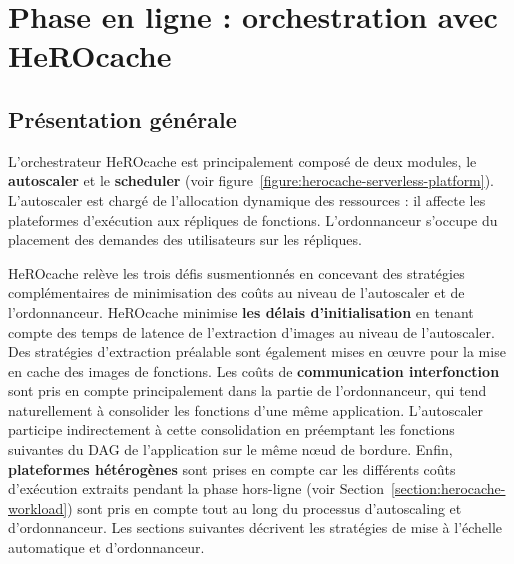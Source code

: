 \section{Phase en ligne : orchestration avec HeROcache} \label{section:herocache-contribution}

\subsection{Présentation générale}

L'orchestrateur HeROcache est principalement composé de deux modules, le \textbf{autoscaler} et le \textbf{scheduler} (voir figure~\ref{figure:herocache-serverless-platform}). L'autoscaler est chargé de l'allocation dynamique des ressources : il affecte les plateformes d'exécution aux répliques de fonctions. L'ordonnanceur s'occupe du placement des demandes des utilisateurs sur les répliques.

HeROcache relève les trois défis susmentionnés en concevant des stratégies complémentaires de minimisation des coûts au niveau de l'autoscaler et de l'ordonnanceur. HeROcache minimise \textbf{les délais d'initialisation} en tenant compte des temps de latence de l'extraction d'images au niveau de l'autoscaler. Des stratégies d'extraction préalable sont également mises en œuvre pour la mise en cache des images de fonctions. Les coûts de \textbf{communication interfonction} sont pris en compte principalement dans la partie de l'ordonnanceur, qui tend naturellement à consolider les fonctions d'une même application. L'autoscaler participe indirectement à cette consolidation en préemptant les fonctions suivantes du DAG de l'application sur le même nœud de bordure. Enfin, \textbf{plateformes hétérogènes} sont prises en compte car les différents coûts d'exécution extraits pendant la phase hors-ligne (voir Section~\ref{section:herocache-workload}) sont pris en compte tout au long du processus d'autoscaling et d'ordonnanceur. Les sections suivantes décrivent les stratégies de mise à l'échelle automatique et d'ordonnanceur.

